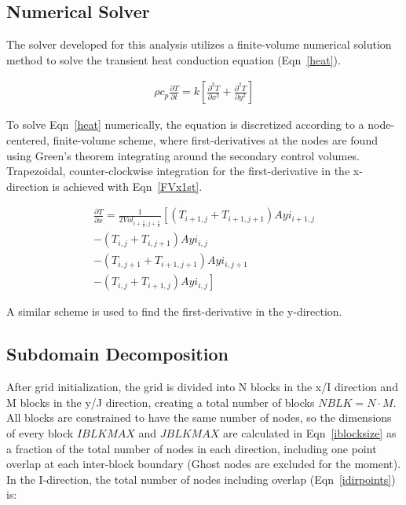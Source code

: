 \documentclass[twocolumn,10pt]{asme2ej}
\begin{document}
\subsection{Numerical Solver}

The solver developed for this analysis utilizes a finite-volume numerical solution method to solve the transient heat conduction equation (Eqn~\ref{heat}).

\begin{equation}
\begin{split}
\rho c_p \frac{\partial T}{\partial t} =
    k \left[ \frac{\partial^2 T}{\partial x^2}
    + \frac{\partial^2 T}{\partial y^2} \right]
\end{split}
\label{heat}
\end{equation}

\noindent To solve Eqn~\ref{heat} numerically, the equation is discretized according to a node-centered, finite-volume scheme, where first-derivatives at the nodes are found using Green's theorem integrating around the secondary control volumes.  Trapezoidal, counter-clockwise integration for the first-derivative in the x-direction is achieved with Eqn~\ref{FVx1st}.

\begin{equation}
\begin{split}
\frac{\partial T}{\partial x} = \frac{1}{2Vol_{i+\frac{1}{2},j+\frac{1}{2}}}
    \left[ \left(T_{i+1,j} + T_{i+1,j+1} \right)Ayi_{i+1,j} \right. \\
    \left. - \left(T_{i,j} + T_{i,j+1} \right)Ayi_{i,j} \right. \\
    \left. - \left(T_{i,j+1} + T_{i+1,j+1} \right)Ayi_{i,j+1} \right. \\
    \left. - \left(T_{i,j} + T_{i+1,j} \right)Ayi_{i,j} \right]
\end{split}
\label{FVx1st}
\end{equation}

\noindent A similar scheme is used to find the first-derivative in the y-direction.


\subsection{Subdomain Decomposition}

After grid initialization, the grid is divided into N blocks in the x/I direction and M blocks in the y/J direction, creating a total number of blocks $NBLK=N\cdot M$.  All blocks are constrained to have the same number of nodes, so the dimensions of every block $IBLKMAX$ and $JBLKMAX$ are calculated in Eqn~\ref{iblocksize} as a fraction of the total number of nodes in each direction, including one point overlap at each inter-block boundary (Ghost nodes are excluded for the moment).  In the I-direction, the total number of nodes including overlap (Eqn~\ref{idirpoints}) is:
\end{document}
